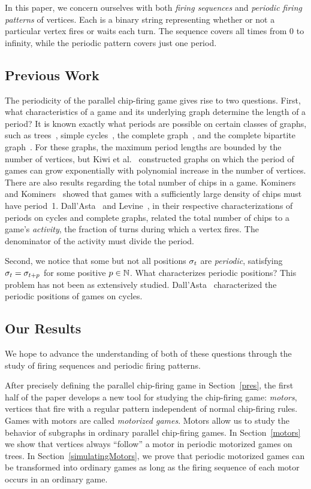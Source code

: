 In this paper, we concern ourselves with both \emph{firing sequences} and
\emph{periodic firing patterns} of vertices. Each is a binary string
representing whether or not a particular vertex fires or waits each turn. The
sequence covers all times from 0 to infinity, while the periodic pattern covers
just one period.

\subsection*{Previous Work}
The periodicity of the parallel chip-firing game gives rise to two
questions. First, what characteristics of a game and its underlying graph
determine the length of a period? It is known exactly what periods are possible
on certain classes of graphs, such as trees~\cite{bitarGoles}, simple
cycles~\cite{cycle}, the complete graph~\cite{levine}, and the complete
bipartite graph~\cite{jiang}. For these graphs, the maximum period lengths are bounded by the number of vertices, but Kiwi et al.~\cite{kiwiEtAl} constructed graphs on
which the period of games can grow exponentially with polynomial increase in
the number of vertices. There are also results regarding the total number of
chips in a game. Kominers and Kominers~\cite{kominers} showed that games with a
sufficiently large density of chips must have period~1. Dall'Asta~\cite{cycle}
and Levine~\cite{levine}, in their respective characterizations of periods on
cycles and complete graphs, related the total number of chips to a game's
\emph{activity}, the fraction of turns during which a vertex fires. The
denominator of the activity must divide the period.

Second, we notice that some but not all positions $\sigma_{t}$ are
\emph{periodic}, satisfying $\sigma_{t} = \sigma_{t+p}$ for some positive $p \in
\mathbb{N}$. What characterizes periodic positions? This problem has not been as
extensively studied. Dall'Asta~\cite{cycle} characterized the periodic
positions of games on cycles.

\subsection*{Our Results}
We hope to advance the understanding of both of these questions through the
study of firing sequences and periodic firing patterns.

After precisely defining the parallel chip-firing game in Section~\ref{pres},
the first half of the paper develops a new tool for studying the chip-firing
game: \emph{motors}, vertices that fire with a regular pattern independent of
normal chip-firing rules. Games with motors are called \emph{motorized
  games}. Motors allow us to study the behavior of subgraphs in ordinary
parallel chip-firing games. In Section~\ref{motors} we show that vertices
always ``follow'' a motor in periodic motorized games on trees. In
Section~\ref{simulatingMotors}, we prove that periodic motorized games can be
transformed into ordinary games as long as the firing sequence of each motor
occurs in an ordinary game.

